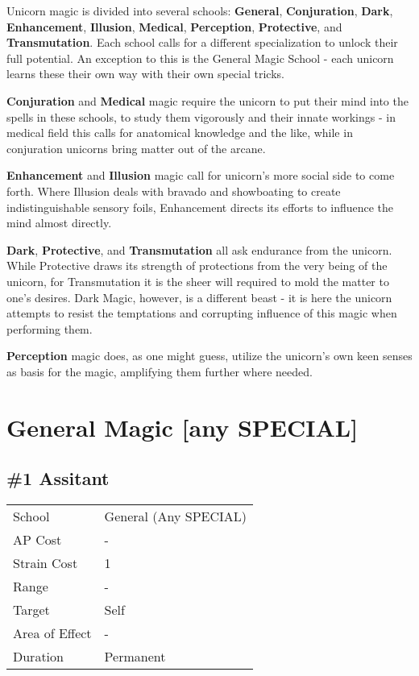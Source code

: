 \documentclass[11pt,a4paper,twocolumn]{book}
\begin{document}
Unicorn magic is divided into several schools: \textbf{General}, \textbf{Conjuration}, \textbf{Dark}, \textbf{Enhancement}, \textbf{Illusion}, \textbf{Medical}, \textbf{Perception}, \textbf{Protective}, and \textbf{Transmutation}. Each school calls for a different specialization to unlock their full potential. An exception to this is the General Magic School - each unicorn learns these their own way with their own special tricks.

\textbf{Conjuration} and \textbf{Medical} magic require the unicorn to put their mind into the spells in these schools, to study them vigorously and their innate workings - in medical field this calls for anatomical knowledge and the like, while in conjuration unicorns bring matter out of the arcane.


\textbf{Enhancement} and \textbf{Illusion} magic call for unicorn's more social side to come forth. Where Illusion deals with bravado and showboating to create indistinguishable sensory foils, Enhancement directs its efforts to influence the mind almost directly.

\textbf{Dark}, \textbf{Protective}, and \textbf{Transmutation} all ask endurance from the unicorn. While Protective draws its strength of protections from the very being of the unicorn, for Transmutation it is the sheer will required to mold the matter to one's desires. Dark Magic, however, is a different beast - it is here the unicorn attempts to resist the temptations and corrupting influence of this magic when performing them.

\textbf{Perception} magic does, as one might guess, utilize the unicorn's own keen senses as basis for the magic, amplifying them further where needed.



\vfill


\section*{General Magic [any SPECIAL]}
\subsection*{\#1 Assitant}
{
	\begin{tabu} to 75mm{| X[l,4] | X[l,7] |}
		\hline
		School 			& General (Any SPECIAL) 	\\
		AP Cost	      	& - 				\\
		Strain Cost     & 1 				\\
		Range     		& - 				\\
		Target      	& Self 				\\
		Area of Effect  & - 	 			\\
		Duration     	& Permanent 		\\ \hline
	\end{tabu}
	
}
\end{document}
